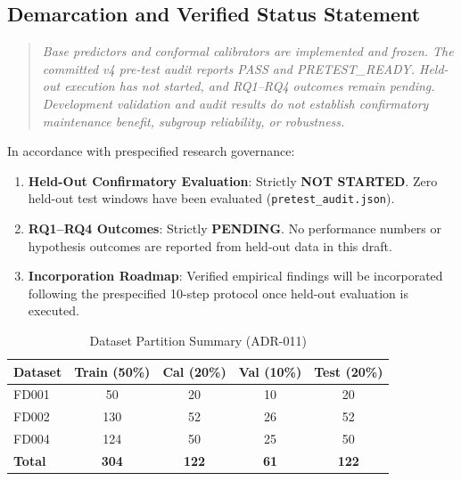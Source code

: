 \subsection{Demarcation and Verified Status Statement}
\begin{quote}
\itshape
Base predictors and conformal calibrators are implemented and frozen. The committed v4 pre-test audit reports PASS and PRETEST\_READY. Held-out execution has not started, and RQ1--RQ4 outcomes remain pending. Development validation and audit results do not establish confirmatory maintenance benefit, subgroup reliability, or robustness.
\end{quote}
In accordance with prespecified research governance:
\begin{enumerate}
  \item \textbf{Held-Out Confirmatory Evaluation}: Strictly \textbf{NOT STARTED}. Zero held-out test windows have been evaluated (\texttt{pretest\_audit.json}).
  \item \textbf{RQ1--RQ4 Outcomes}: Strictly \textbf{PENDING}. No performance numbers or hypothesis outcomes are reported from held-out data in this draft.
  \item \textbf{Incorporation Roadmap}: Verified empirical findings will be incorporated following the prespecified 10-step protocol once held-out evaluation is executed.
\end{enumerate}

\begin{table}[t]
\caption{Dataset Partition Summary (ADR-011)}
\label{tab:splits}
\centering
\small
\begin{tabular}{l c c c c}
\toprule
\textbf{Dataset} & \textbf{Train (50\%)} & \textbf{Cal (20\%)} & \textbf{Val (10\%)} & \textbf{Test (20\%)} \\
\midrule
FD001 & 50 & 20 & 10 & 20 \\
FD002 & 130 & 52 & 26 & 52 \\
FD004 & 124 & 50 & 25 & 50 \\
\midrule
\textbf{Total} & \textbf{304} & \textbf{122} & \textbf{61} & \textbf{122} \\
\bottomrule
\end{tabular}
\end{table}
